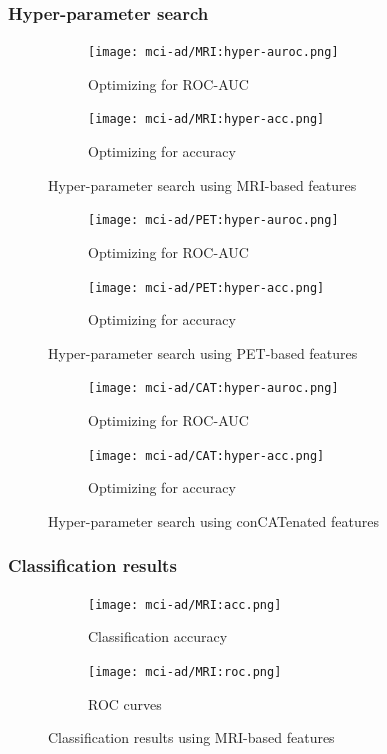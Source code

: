 \documentclass[12pt,a4paper]{article}
\begin{document}
\subsubsection{Hyper-parameter search}
\label{sec:mci-ad-hyper}

\begin{figure}[H]
  \centering
  \begin{subfigure}[h]{0.49\textwidth}
    \texttt{[image: mci-ad/MRI:hyper-auroc.png]}
    \caption{Optimizing for ROC-AUC}  
  \end{subfigure}
  \begin{subfigure}[h]{0.49\textwidth}
    \texttt{[image: mci-ad/MRI:hyper-acc.png]}
    \caption{Optimizing for accuracy}  
  \end{subfigure}
  \caption{Hyper-parameter search using MRI-based features}
\end{figure}

\begin{figure}[H]
  \centering
  \begin{subfigure}[h]{0.49\textwidth}
    \texttt{[image: mci-ad/PET:hyper-auroc.png]}
    \caption{Optimizing for ROC-AUC}  
  \end{subfigure}
  \begin{subfigure}[h]{0.49\textwidth}
    \texttt{[image: mci-ad/PET:hyper-acc.png]}
    \caption{Optimizing for accuracy}  
  \end{subfigure}
  \caption{Hyper-parameter search using PET-based features}
\end{figure}

\begin{figure}[H]
  \centering
  \begin{subfigure}[h]{0.49\textwidth}
    \texttt{[image: mci-ad/CAT:hyper-auroc.png]}
    \caption{Optimizing for ROC-AUC}  
  \end{subfigure}
  \begin{subfigure}[h]{0.49\textwidth}
    \texttt{[image: mci-ad/CAT:hyper-acc.png]}
    \caption{Optimizing for accuracy}  
  \end{subfigure}
  \caption{Hyper-parameter search using conCATenated features}
\end{figure}

\subsubsection{Classification results}
\label{sec:mci-ad-res}

\begin{figure}[H]
  \centering
  \begin{subfigure}[h]{0.49\textwidth}
    \texttt{[image: mci-ad/MRI:acc.png]}
    \caption{Classification accuracy}  
  \end{subfigure}
  \begin{subfigure}[h]{0.49\textwidth}
    \texttt{[image: mci-ad/MRI:roc.png]}
    \caption{ROC curves}  
  \end{subfigure}
  \caption{Classification results using MRI-based features}
\end{figure}
\end{document}
